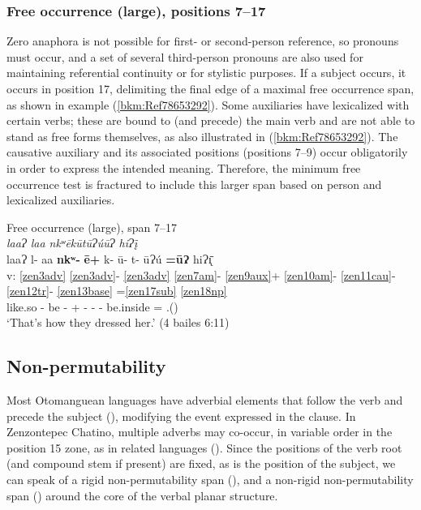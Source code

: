 \documentclass[output=paper]{langscibook}
\begin{document}
\subsubsection{Free occurrence (large), positions 7{}--17}
\label{bkm:Ref113184795}
Zero anaphora is not possible for first- or second-person reference, so pronouns must occur, and a set of several third-person pronouns are also used for maintaining referential continuity or for stylistic purposes. If a subject occurs, it occurs in position 17, delimiting the final edge of a maximal free occurrence span, as shown in example (\ref{bkm:Ref78653292}). Some auxiliaries have lexicalized with certain verbs; these are bound to (and precede) the main verb and are not able to stand as free forms themselves, as also illustrated in (\ref{bkm:Ref78653292}). The causative auxiliary and its associated positions (positions 7{}--9) occur obligatorily in order to express the intended meaning. Therefore, the minimum free occurrence test is fractured to include this larger span based on person and lexicalized auxiliaries.


\ea\label{bkm:Ref78653292} Free occurrence (large), span 7{}--17\\
\textit{laaɁ laa nkʷēkūtūɁúūɁ hiɁį̄} \\ 
\glll {} laaɁ l- aa \textbf{nkʷ-} \textbf{ē+} k- ū- t- ūɁú \textbf{=ūɁ} hiɁ\={\k{ı}}\\
v: \ref{zen3adv} \ref{zen3adv}- \ref{zen3adv} \ref{zen7am}{}- \ref{zen9aux}+ \ref{zen10am}{}- \ref{zen11cau}{}- \ref{zen12tr}{}- \ref{zen13base} =\ref{zen17sub} \ref{zen18np}  \\
{} like.so \Stat{}- be \Pfv{}- \Caus{}+ \Pot{}- \Caus{}- \Trvz{}- be.inside =\Third\Pl{} \Obj.(\Third{})\\
\glt `That's how they dressed her.' (4 bailes 6:11)
\z

\subsection{Non-permutability}
\label{bkm:Ref90386650}
Most Otomanguean languages have adverbial elements that follow the verb and precede the subject (\citealt[21--22]{Campbell2017}), modifying the event expressed in the clause. In Zenzontepec Chatino, multiple adverbs may co-occur, in variable order in the position 15 zone, as in related languages (\citealt[41]{Gutierrez-Lorenzo2014}). Since the positions of the verb root (and compound stem if present) are fixed, as is the position of the subject, we can speak of a rigid non-permutability span (), and a non-rigid non-permutability span () around the core of the verbal planar structure.
\end{document}
